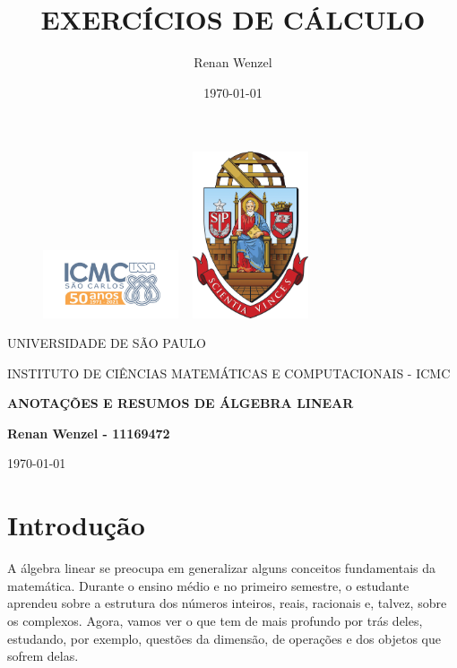 \documentclass{article}
\title{EXERC\'ICIOS DE C\'ALCULO}
\author{Renan Wenzel}
\date{\today}
\begin{document}
\begin{figure}[ht]
	\includegraphics[width=4cm]{icmc.png}
	\hspace{5cm}
	\includegraphics[height=4.9cm,width=4cm]{brasao_usp_cor.jpg}
	\endminipage
\end{figure}

\begin{center}
	\vspace{1cm}
	\LARGE
	UNIVERSIDADE DE S\~AO PAULO

	\vspace{1.3cm}
	\LARGE
	INSTITUTO DE CI\^ENCIAS MATEM\'ATICAS E COMPUTACIONAIS - ICMC

	\vspace{1.7cm}
	\Large
	\textbf{ANOTA\c C\~OES E RESUMOS DE \'ALGEBRA LINEAR}

	\vspace{1.3cm}
	\large
	\textbf{Renan Wenzel - 11169472}

	\vspace{1.3cm}
	\today
\end{center}

\newpage

\tableofcontents

\newpage

\section{Introdu\c c\~ao}

A \'algebra linear se preocupa em generalizar alguns conceitos fundamentais da matem\'atica.
Durante o ensino m\'edio e no primeiro semestre, o estudante aprendeu sobre a estrutura
dos n\'umeros inteiros, reais, racionais e, talvez, sobre os complexos. Agora, vamos ver o que
tem de mais profundo por tr\'as deles, estudando, por exemplo, quest\~oes da dimens\~ao, de
opera\c c\~oes e dos objetos que sofrem delas.
\end{document}
